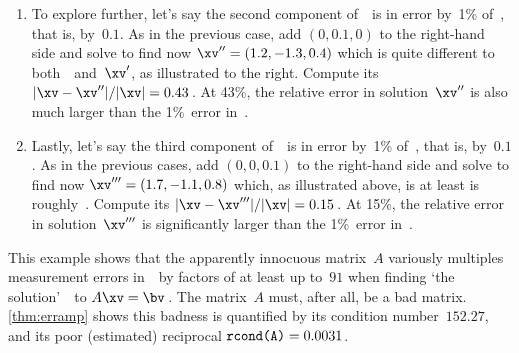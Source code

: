 \begin{example}
\begin{enumerate}
\item 
\begin{figbox}{}
To explore further, let's say the second component of~\bv\ is in error by~1\% of~\bv, that is, by~\(0.1\).
As in the previous case, add \((0,0.1,0)\) to the right-hand side and solve to find now \(\xv''=(1.2,-1.3,0.4)\) which is quite different to both~\xv\ and~\(\xv'\), as illustrated to the right.
Compute its  \(|\xv-\xv''|/|\xv|=0.43\)\,.
At 43\%, the relative error in solution~\(\xv''\) is also much larger than the 1\%~error in~\bv.
\end{figbox}


\item Lastly, let's say the third component of~\bv\ is in error by~1\% of~\bv, that is, by~\(0.1\).
As in the previous cases, add \((0,0,0.1)\) to the right-hand side and solve to find now \(\xv'''=(1.7,-1.1,0.8)\) which, as illustrated above, is at least is roughly~\xv.
Compute its  \(|\xv-\xv'''|/|\xv|=0.15\)\,.
At 15\%, the relative error in solution~\(\xv'''\) is significantly larger than the 1\%~error in~\bv.

\end{enumerate}
This example shows that the apparently innocuous matrix~\(A\) variously multiples measurement errors in~\bv\ by factors of at least up to~\(91\) when finding `the solution'~\xv\ to \(A\xv=\bv\)\,.
The matrix~\(A\) must, after all, be a bad matrix.
\cref{thm:erramp} shows this badness is quantified by its  condition number~\(152.27\), and its poor (estimated) reciprocal \(\verb|rcond(A)|=0.0031\). 
\end{example}




